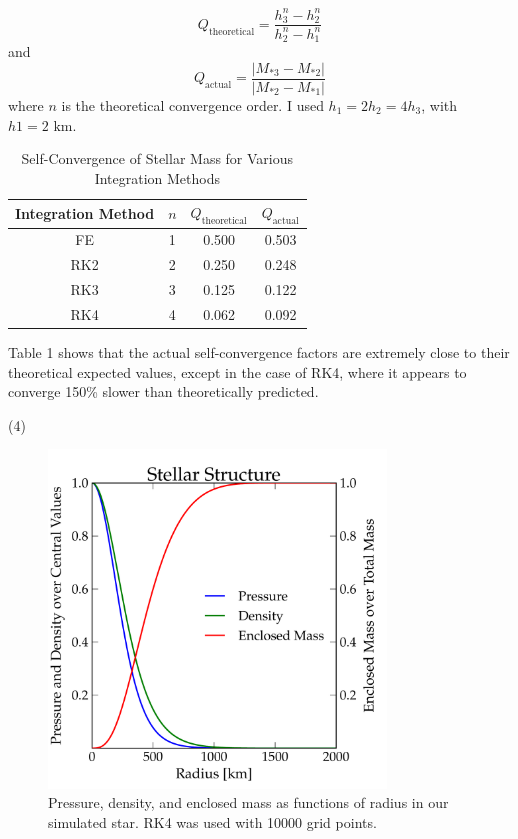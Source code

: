\documentclass{article}
\newcommand{\km}[0]{\text{\ km}}
\begin{document}
\begin{spacing}{1.1}
\[
Q_\text{theoretical} = \frac{h_3^n - h_2^n}{h_2^n - h_1^n}
\]
and
\[
Q_\text{actual} = \frac{|M_{*3} - M_{*2}|}{|M_{*2} - M_{*1}|}
\]
where \(n\) is the theoretical convergence order. I used \(h_1 = 2h_2 = 4h_3\), with \(h1 = 2\km\).

\begin{table}[H]
\centering
\caption{Self-Convergence of Stellar Mass for Various Integration Methods}
\vspace{0.25cm}
\begin{tabular}{|c|c|c|c|}
\hline
Integration Method & \(n\) & \(Q_\text{theoretical}\) & \(Q_\text{actual}\) \\
\hline
FE & 1 & 0.500 & 0.503 \\
RK2 & 2 & 0.250 & 0.248 \\
RK3 & 3 & 0.125 & 0.122 \\
RK4 & 4 & 0.062 & 0.092 \\
\hline
\end{tabular}
\end{table}

Table 1 shows that the actual self-convergence factors are extremely close to their theoretical expected values, except in the case of RK4, where it appears to converge 150\% slower than theoretically predicted.
\newpage

\noindent (4)
\begin{figure}[H]
 \centering
 \hspace{0cm} \includegraphics[width=0.8\textwidth]{fig-problem4.pdf}
 \caption{Pressure, density, and enclosed mass as functions of radius in our simulated star. RK4 was used with 10000 grid points.}
 \label{fig-problem1}
\end{figure} 


\end{spacing}
\end{document}
